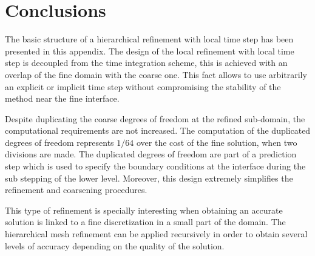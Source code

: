 \section{Conclusions}


The basic structure of a hierarchical refinement with local time step has been presented in this appendix. The design of the local refinement with local time step is decoupled from the time integration scheme, this is achieved with an overlap of the fine domain with the coarse one. This fact allows to use arbitrarily an explicit or implicit time step without compromising the stability of the method near the fine interface.

Despite duplicating the coarse degrees of freedom at the refined sub-domain, the computational requirements are not increased. The computation of the duplicated degrees of freedom represents $1/64$ over the cost of the fine solution, when two divisions are made. The duplicated degrees of freedom are part of a prediction step which is used to specify the boundary conditions at the interface during the sub stepping of the lower level. Moreover, this design extremely simplifies the refinement and coarsening procedures.

This type of refinement is specially interesting when obtaining an accurate solution is linked to a fine discretization in a small part of the domain. The hierarchical mesh refinement can be applied recursively in order to obtain several levels of accuracy depending on the quality of the solution.


